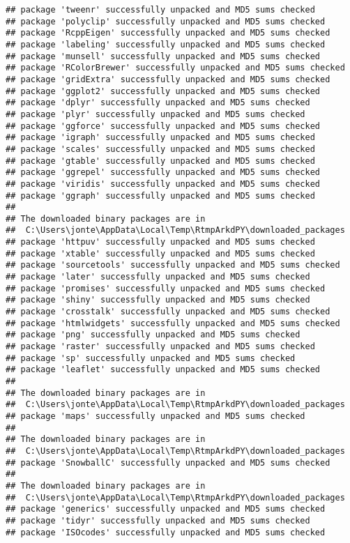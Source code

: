 \documentclass[]{article}
\begin{document}
\begin{verbatim}
## package 'tweenr' successfully unpacked and MD5 sums checked
## package 'polyclip' successfully unpacked and MD5 sums checked
## package 'RcppEigen' successfully unpacked and MD5 sums checked
## package 'labeling' successfully unpacked and MD5 sums checked
## package 'munsell' successfully unpacked and MD5 sums checked
## package 'RColorBrewer' successfully unpacked and MD5 sums checked
## package 'gridExtra' successfully unpacked and MD5 sums checked
## package 'ggplot2' successfully unpacked and MD5 sums checked
## package 'dplyr' successfully unpacked and MD5 sums checked
## package 'plyr' successfully unpacked and MD5 sums checked
## package 'ggforce' successfully unpacked and MD5 sums checked
## package 'igraph' successfully unpacked and MD5 sums checked
## package 'scales' successfully unpacked and MD5 sums checked
## package 'gtable' successfully unpacked and MD5 sums checked
## package 'ggrepel' successfully unpacked and MD5 sums checked
## package 'viridis' successfully unpacked and MD5 sums checked
## package 'ggraph' successfully unpacked and MD5 sums checked
## 
## The downloaded binary packages are in
##  C:\Users\jonte\AppData\Local\Temp\RtmpArkdPY\downloaded_packages
## package 'httpuv' successfully unpacked and MD5 sums checked
## package 'xtable' successfully unpacked and MD5 sums checked
## package 'sourcetools' successfully unpacked and MD5 sums checked
## package 'later' successfully unpacked and MD5 sums checked
## package 'promises' successfully unpacked and MD5 sums checked
## package 'shiny' successfully unpacked and MD5 sums checked
## package 'crosstalk' successfully unpacked and MD5 sums checked
## package 'htmlwidgets' successfully unpacked and MD5 sums checked
## package 'png' successfully unpacked and MD5 sums checked
## package 'raster' successfully unpacked and MD5 sums checked
## package 'sp' successfully unpacked and MD5 sums checked
## package 'leaflet' successfully unpacked and MD5 sums checked
## 
## The downloaded binary packages are in
##  C:\Users\jonte\AppData\Local\Temp\RtmpArkdPY\downloaded_packages
## package 'maps' successfully unpacked and MD5 sums checked
## 
## The downloaded binary packages are in
##  C:\Users\jonte\AppData\Local\Temp\RtmpArkdPY\downloaded_packages
## package 'SnowballC' successfully unpacked and MD5 sums checked
## 
## The downloaded binary packages are in
##  C:\Users\jonte\AppData\Local\Temp\RtmpArkdPY\downloaded_packages
## package 'generics' successfully unpacked and MD5 sums checked
## package 'tidyr' successfully unpacked and MD5 sums checked
## package 'ISOcodes' successfully unpacked and MD5 sums checked

\end{verbatim}
\end{document}
